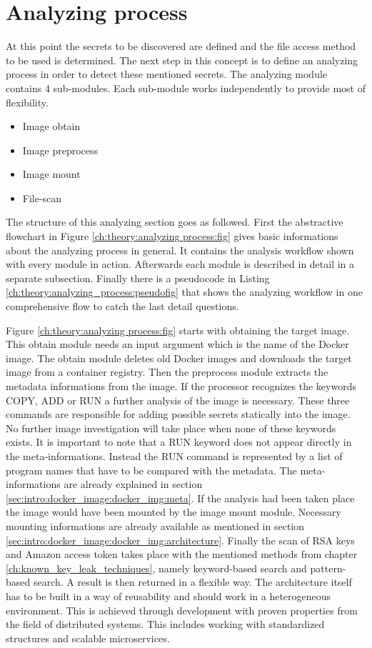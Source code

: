 \section{Analyzing process}
\label{ch:theory:analyzing_process}
At this point the secrets to be discovered are defined and the file access method to be used is determined. 
The next step in this concept is to define an analyzing process in order to detect these mentioned secrets.
The analyzing module contains 4 sub-modules.
Each sub-module works independently to provide most of flexibility.
\begin{itemize}
\item Image obtain
\item Image preprocess
\item Image mount
\item File-scan
\end{itemize}
The structure of this analyzing section goes as followed.
First the abstractive flowchart in Figure \ref{ch:theory:analyzing process:fig} gives basic informations about the analyzing process in general. 
It contains the analysis workflow shown with every module in action. 
Afterwards each module is described in detail in a separate subsection.
Finally there is a pseudocode in Listing \ref{ch:theory:analyzing_process:pseudofig} that shows the analyzing workflow in one comprehensive flow to catch the last detail questions.

Figure \ref{ch:theory:analyzing process:fig} starts with obtaining the target image. 
This obtain module needs an input argument which is the name of the Docker image.
The obtain module deletes old Docker images and downloads the target image from a container registry. 
Then the preprocess module extracts the metadata informations from the image. 
If the processor recognizes the keywords COPY, ADD or RUN a further analysis of the image is necessary.
These three commands are responsible for adding possible secrets statically into the image.
No further image investigation will take place when none of these keywords exists. 
It is important to note that a RUN keyword does not appear directly in the meta-informations. 
Instead the RUN command is represented by a list of program names that have to be compared with the metadata.
The meta-informations are already explained in section \ref{sec:intro:docker_image:docker_img:meta}.
If the analysis had been taken place the image would have been mounted by the image mount module.
Necessary mounting informations are already available as mentioned in section \ref{sec:intro:docker_image:docker_img:architecture}.
Finally the scan of RSA keys and Amazon access token takes place with the mentioned methods from chapter \ref{ch:known_key_leak_techniques}, namely keyword-based search and pattern-based search. A result is then returned in a flexible way.
The architecture itself has to be built in a way of reusability and should work in a heterogeneous environment.
This is achieved through development with proven properties from the field of distributed systems. 
This includes working with standardized structures and scalable microservices.

